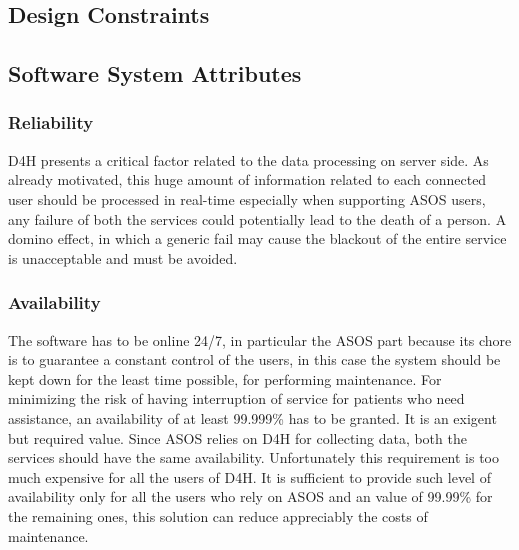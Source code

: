 \paragraph{}


{\color{Blue}\subsection{Design Constraints}}

{\color{Blue}\subsection{Software System Attributes}}
{\color{Blue}\subsubsection{Reliability}}
D4H presents a critical factor related to the data processing on server side. As already motivated, this huge amount of information related to each connected user should be processed in real-time especially when supporting ASOS users, any failure of both the services could potentially lead to the death of a person. A domino effect, in which a generic fail may cause the blackout of the entire service is unacceptable and must be avoided.
\paragraph{}

{\color{Blue}\subsubsection{Availability}}
The software has to be online 24/7, in particular the ASOS part because its chore is to guarantee a constant control of the users, in this case the system should be kept down for the least time possible, for performing maintenance. For minimizing the risk of having interruption of service for patients who need assistance, an availability of at least 99.999\% has to be granted. It is an exigent but required value. Since ASOS relies on D4H for collecting data, both the services should have the same availability. Unfortunately this requirement is too much expensive for all the users of D4H. It is sufficient to provide such level of availability only for all the users who rely on ASOS and an value of 99.99\% for the remaining ones, this solution can reduce appreciably the costs of maintenance.
